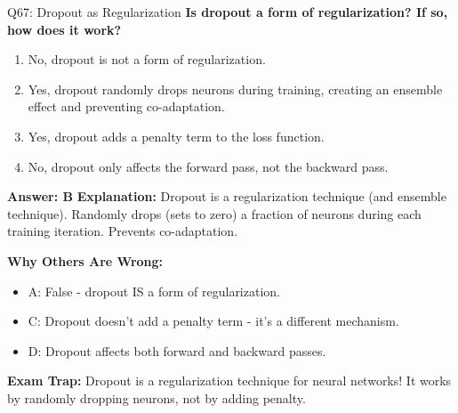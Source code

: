 \documentclass[8pt]{beamer}
\begin{document}
	\begin{frame}{Q67: Dropout as Regularization}
		\fontsize{6.5}{7.5}\selectfont
		\textbf{Is dropout a form of regularization? If so, how does it work?}
		
		\begin{enumerate}
			\item No, dropout is not a form of regularization.
			\item Yes, dropout randomly drops neurons during training, creating an ensemble effect and preventing co-adaptation.
			\item Yes, dropout adds a penalty term to the loss function.
			\item No, dropout only affects the forward pass, not the backward pass.
		\end{enumerate}
		
		\vspace{0.05cm}
		\textcolor{myblue}{\textbf{Answer: B}}
		\vspace{0.05cm}
		\textcolor{myblue}{\textbf{Explanation:}} Dropout is a regularization technique (and ensemble technique). Randomly drops (sets to zero) a fraction of neurons during each training iteration. Prevents co-adaptation.
		
		\vspace{0.05cm}
		\textcolor{myred}{\textbf{Why Others Are Wrong:}}
		\begin{itemize}
			\item \textcolor{myred}{A:} False - dropout IS a form of regularization.
			\item \textcolor{myred}{C:} Dropout doesn't add a penalty term - it's a different mechanism.
			\item \textcolor{myred}{D:} Dropout affects both forward and backward passes.
		\end{itemize}
		
		\textcolor{myred}{\textbf{Exam Trap:}} Dropout is a \textcolor{myblue}{regularization technique} for neural networks! It works by randomly dropping neurons, not by adding penalty.
	\end{frame}
	
\end{document}
